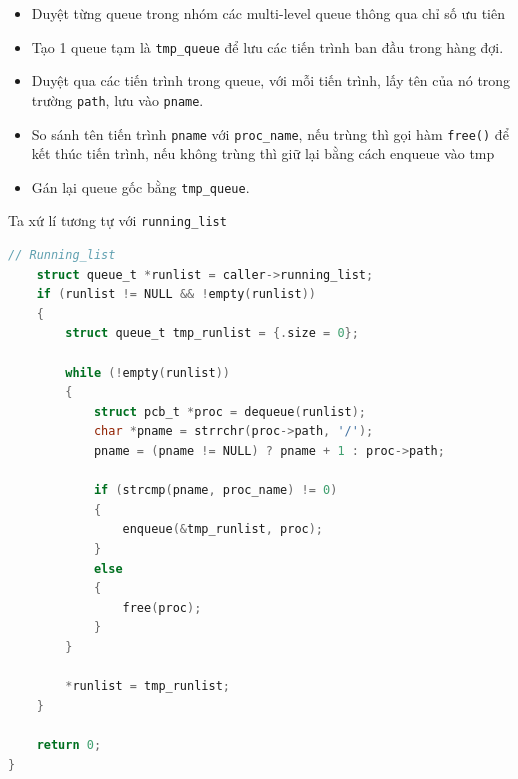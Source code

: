 \begin{itemize}
    \item Duyệt từng queue trong nhóm các multi-level queue thông qua chỉ số ưu tiên
    \item Tạo 1 queue tạm là \verb|tmp_queue| để lưu các tiến trình ban đầu trong hàng đợi.
    \item Duyệt qua các tiến trình trong queue, với mỗi tiến trình, lấy tên của nó trong trường \verb|path|, lưu vào \verb|pname|.
    \item So sánh tên tiến trình \verb|pname| với \verb|proc_name|, nếu trùng thì gọi hàm \verb|free()| để kết thúc tiến trình, nếu không trùng thì giữ lại bằng cách enqueue vào tmp
    \item Gán lại queue gốc bằng \verb|tmp_queue|.
\end{itemize}

Ta xứ lí tương tự với \verb|running_list|
\begin{lstlisting}[style=Cstyle,language=C]
    // Running_list
    struct queue_t *runlist = caller->running_list;
    if (runlist != NULL && !empty(runlist))
    {
        struct queue_t tmp_runlist = {.size = 0};

        while (!empty(runlist))
        {
            struct pcb_t *proc = dequeue(runlist);
            char *pname = strrchr(proc->path, '/');
            pname = (pname != NULL) ? pname + 1 : proc->path;

            if (strcmp(pname, proc_name) != 0)
            {
                enqueue(&tmp_runlist, proc);
            }
            else
            {
                free(proc);
            }
        }

        *runlist = tmp_runlist;
    }

    return 0;
}
\end{lstlisting}